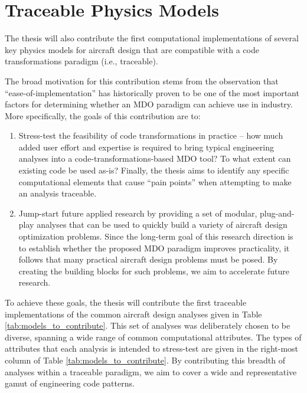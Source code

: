 \chapter{Traceable Physics Models}
\label{chap:physics}

The thesis will also contribute the first computational implementations of several key physics models for aircraft design that are compatible with a code transformations paradigm (i.e., traceable).

The broad motivation for this contribution stems from the observation that ``ease-of-implementation'' has historically proven to be one of the most important factors for determining whether an MDO paradigm can achieve use in industry. More specifically, the goals of this contribution are to:

\begin{enumerate}
    \item Stress-test the feasibility of code transformations in practice -- how much added user effort and expertise is required to bring typical engineering analyses into a code-transformations-based MDO tool? To what extent can existing code be used as-is? Finally, the thesis aims to identify any specific computational elements that cause ``pain points'' when attempting to make an analysis traceable.
    \item Jump-start future applied research by providing a set of modular, plug-and-play analyses that can be used to quickly build a variety of aircraft design optimization problems. Since the long-term goal of this research direction is to establish whether the proposed MDO paradigm improves practicality, it follows that many practical aircraft design problems must be posed. By creating the building blocks for such problems, we aim to accelerate future research.
\end{enumerate}

To achieve these goals, the thesis will contribute the first traceable implementations of the common aircraft design analyses given in Table \ref{tab:models_to_contribute}. This set of analyses was deliberately chosen to be diverse, spanning a wide range of common computational attributes. The types of attributes that each analysis is intended to stress-test are given in the right-most column of Table \ref{tab:models_to_contribute}. By contributing this breadth of analyses within a traceable paradigm, we aim to cover a wide and representative gamut of engineering code patterns.

